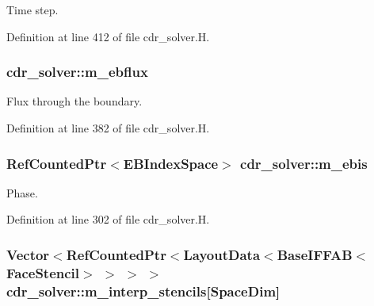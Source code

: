 Time step. 



Definition at line 412 of file cdr\+\_\+solver.\+H.

\subsubsection[{\texorpdfstring{m\+\_\+ebflux}{m_ebflux}}]{ cdr\+\_\+solver\+::m\+\_\+ebflux\hspace{0.3cm}{\ttfamily [protected]}}\hypertarget{classcdr__solver_ac7b6d7c3af1fb23c6cd50314e3a34bbb}{}\label{classcdr__solver_ac7b6d7c3af1fb23c6cd50314e3a34bbb}


Flux through the boundary. 



Definition at line 382 of file cdr\+\_\+solver.\+H.

\subsubsection[{\texorpdfstring{m\+\_\+ebis}{m_ebis}}]{\setlength{\rightskip}{0pt plus 5cm}Ref\+Counted\+Ptr$<$E\+B\+Index\+Space$>$ cdr\+\_\+solver\+::m\+\_\+ebis\hspace{0.3cm}{\ttfamily [protected]}}\hypertarget{classcdr__solver_a9c7cd91e565825df73dc595275f0b76c}{}\label{classcdr__solver_a9c7cd91e565825df73dc595275f0b76c}


Phase. 



Definition at line 302 of file cdr\+\_\+solver.\+H.

\subsubsection[{\texorpdfstring{m\+\_\+interp\+\_\+stencils}{m_interp_stencils}}]{\setlength{\rightskip}{0pt plus 5cm}Vector$<$Ref\+Counted\+Ptr$<$Layout\+Data$<$Base\+I\+F\+F\+AB$<$Face\+Stencil$>$ $>$ $>$ $>$ cdr\+\_\+solver\+::m\+\_\+interp\+\_\+stencils\mbox{[}Space\+Dim\mbox{]}\hspace{0.3cm}{\ttfamily [protected]}}\hypertarget{classcdr__solver_a5066d2efe4c78ce733c041b7a7284cf6}{}\label{classcdr__solver_a5066d2efe4c78ce733c041b7a7284cf6}


